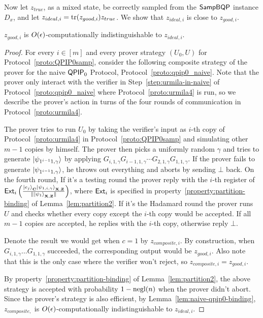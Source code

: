 Now let $z_{true}$, as a mixed state, be correctly sampled from the $\operatorname{\mathsf{SampBQP}}$ instance $D_x$,
and let $z_{ideal, i}=\operatorname{tr}(z_{good, i})z_{true}$.
We show that $z_{ideal, i}$ is close to $z_{good, i}$.
\begin{lemma}
	\label{thm:zgood-zideal}
	$z_{good, i}$ is $O(\epsilon)$-computationally indistinguishable to $z_{ideal, i}$.
\end{lemma}
\begin{proof}
	For every $i\in [m]$ and every prover strategy $(U_0,U)$ for Protocol~\ref{proto:QPIP0samp}, consider the following composite strategy of the prover for the naive $\operatorname{\mathsf{QPIP}}_0$ Protocol, Protocol~\ref{proto:qpip0_naive}. Note that the prover only interact with the verifier in Step~\ref{step:urmila-in-naive} of Protocol~\ref{proto:qpip0_naive} where Protocol~\ref{proto:urmila4} is run, so we describe the prover's action in turns of the four rounds of communication in Protocol~\ref{proto:urmila4}.

	The prover tries to run $U_0$ by taking the verifier's input as $i$-th copy of Protocol~\ref{proto:urmila4} in Protocol~\ref{proto:QPIP0samp} and simulating other $m-1$ copies by himself. The prover then picks a uniformly random $\gamma$ and  tries to generate $\ket{\psi_{1^{i-1}1,\gamma}}$ by applying $G_{i,1,\gamma}G_{i-1,1,\gamma} \cdots G_{2,1,\gamma}G_{1,1,\gamma}$. If the prover fails to generate $\ket{\psi_{1^{i-1}1,\gamma}}$, he throws out everything and aborts by sending $\bot$ back.   On the fourth round,  If it's a testing round the prover reply with the $i$-th register of $\mathsf{Ext}_i\left(\frac{\ket{e_j}_{\mathbf{C}}\ket{\psi_{1,i,\gamma}}_{\mathbf{X},\mathbf{Z}}}{\|\ket{\psi_1}_{\mathbf{X},\mathbf{Z}}\|}\right)$, where $\mathsf{Ext}_i$ is specified in property~\ref{property:partition-binding} of Lemma~\ref{lem:partition2}. If it's the Hadamard round  the prover  runs $U$ and checks whether every copy except the $i$-th copy would be accepted. If all $m-1$ copies are accepted, he replies with the $i$-th copy, otherwise reply $\bot$.


	Denote the result we would get when $c=1$ by $z_{composite,i}$. By construction, when $G_{i,1,\gamma}\ldots G_{1,1,\gamma}$ succeeded, the corresponding output would be $z_{good,i}$. Also note that this is the only case where the verifier won't reject, so $z_{composite,i}=z_{good,i}$.

	By property~\ref{property:partition-binding} of Lemma~\ref{lem:partition2}, the above strategy is accepted with probability $1-\operatorname{negl}(n)$ when the prover didn't abort.
	Since the prover's strategy is also efficient, by Lemma~\ref{lem:naive-qpip0-binding},
	$z_{composite,}$ is $O(\epsilon)$-computationally indistinguishable to $z_{ideal, i}$.
\end{proof}


